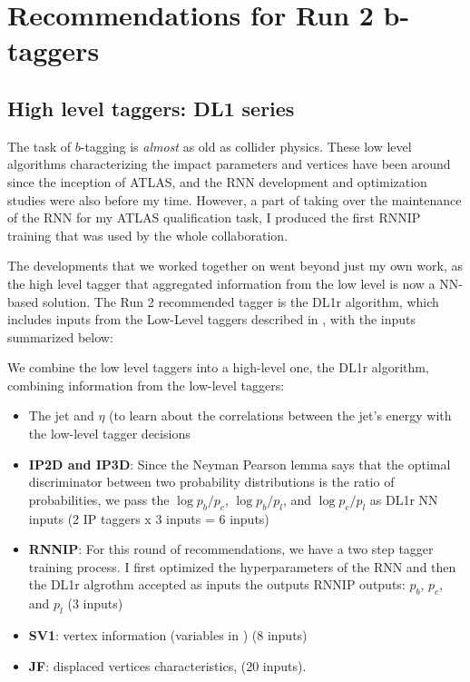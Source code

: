 \section{Recommendations for Run 2 b-taggers}

\subsection{High level taggers: DL1 series}


The task of $b$-tagging is \emph{almost} as old as collider physics.
These low level algorithms characterizing the impact parameters and vertices have been around since the inception of ATLAS, and the RNN development and optimization studies were also before my time.
However, a part of taking over the maintenance of the RNN for my ATLAS qualification task, I produced the first RNNIP training that was used by the whole collaboration.

The developments that we worked together on went beyond just my own work, as the high level tagger that aggregated information from the low level is now a NN-based solution. The Run 2 recommended tagger is the DL1r algorithm, which includes inputs from the Low-Level taggers described in \Sect{\ref{sec:low-level}}, with the inputs summarized below:


We combine the low level taggers into a high-level one, the DL1r algorithm, combining information from the low-level taggers:
\begin{itemize}%
	\item The jet \pt and $\eta$ (to learn about the correlations between the jet's energy with the low-level tagger decisions
	\item \textbf{IP2D and IP3D}: Since the Neyman Pearson lemma says that the optimal discriminator between two probability distributions is the ratio of probabilities, we pass the $\log p_b / p_c$, $\log p_b / p_l$, and $\log p_c / p_l$ as DL1r NN inputs (2 IP taggers x 3 inputs = 6 inputs) 
	\item \textbf{RNNIP}: For this round of recommendations, we have a two step tagger training process. I first optimized the hyperparameters of the RNN and then the DL1r algrothm accepted as inputs the outputs RNNIP outputs: $p_b$, $p_c$, and $p_l$ (3 inputs)
	\item \textbf{SV1}: vertex information (variables in \Tab{\ref{tab:sv1-inputs}}) (8 inputs)
	\item \textbf{JF}: displaced vertices characteristics, \Tab{\ref{tab:jf-inputs}} (20 inputs).
\end{itemize} 

